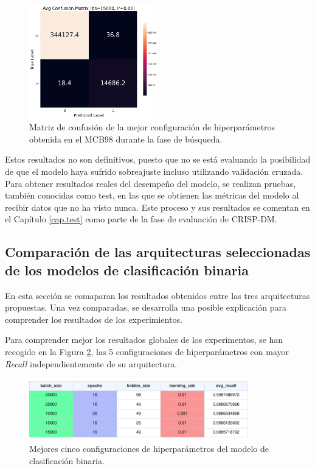 \begin{figure}[H]
    \centering
    \includegraphics[width=0.5\textwidth]{./img/modelo/matrices_confusion/MC_ENT_MCB98.png}
    \caption{Matriz de confusión de la mejor configuración de hiperparámetros obtenida en el MCB98 durante la fase de búsqueda.}
    \label{fig:MC_ENT_MCB98}
\end{figure}



Estos resultados no son definitivos, puesto que no se está evaluando la posibilidad de que el modelo haya sufrido sobreajuste incluso utilizando validación cruzada. Para obtener resultados reales del desempeño del modelo, se realizan pruebas, también conocidas como test, en las que se obtienen las métricas del modelo al recibir datos que no ha visto nunca. Este proceso y sus resultados se comentan en el Capítulo \ref{cap.test} como parte de la fase de evaluación de CRISP-DM.


\subsection{Comparación de las arquitecturas seleccionadas de los modelos de clasificación binaria} \label{sec:comp.BIN}
En esta sección se comaparan los resultados obtenidos entre las tres arquitecturas propuestas. Una vez comparadas, se desarrolla una posible explicación para comprender los resultados de los experimientos.

Para comprender mejor los resultados globales de los experimentos, se han recogido en la Figura \ref{fig:BINtop5}, las 5 configuraciones de hiperparámetros con mayor \textit{Recall} independientemente de su arquitectura.

\begin{figure}[H]
    \centering
    \includegraphics[width=0.85\textwidth]{./img/modelo/resultados/BINtop5.pdf}
    \caption{Mejores cinco configuraciones de hiperparámetros del modelo de clasificación binaria.}
    \label{fig:BINtop5}
\end{figure}

